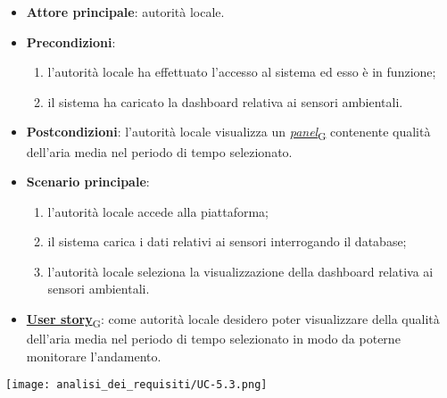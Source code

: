 \begin{itemize}
	\item \textbf{Attore principale}: autorità locale.
	\item \textbf{Precondizioni}:
	      \begin{enumerate}
		      \item l'autorità locale ha effettuato l'accesso al sistema ed esso è in funzione;
		      \item il sistema ha caricato la dashboard relativa ai sensori ambientali.
	      \end{enumerate}
	\item \textbf{Postcondizioni}: l'autorità locale visualizza un \href{https://7last.github.io/docs/pb/documentazione-interna/glossario\#panel}{\textit{panel}\textsubscript{G}} contenente qualità dell'aria media nel periodo di tempo selezionato.
	\item \textbf{Scenario principale}:
	      \begin{enumerate}
		      \item l'autorità locale accede alla piattaforma;
		      \item il sistema carica i dati relativi ai sensori interrogando il database;
		      \item l'autorità locale seleziona la visualizzazione della dashboard relativa ai sensori ambientali.
	      \end{enumerate}
	\item \href{https://7last.github.io/docs/pb/documentazione-interna/glossario\#user-story}{\textbf{User story}\textsubscript{G}}: come autorità locale desidero poter visualizzare della qualità dell'aria media nel periodo di tempo selezionato
	      in modo da poterne monitorare l'andamento.
\end{itemize}
\begin{center}
	\texttt{[image: analisi\_dei\_requisiti/UC-5.3.png]}
\end{center}


